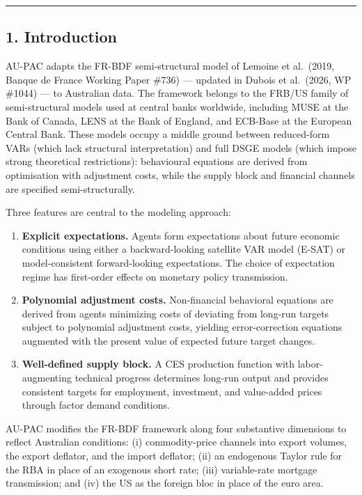 \documentclass[
]{article}
\begin{document}
\begin{center}\rule{0.5\linewidth}{0.5pt}\end{center}

\subsection{1. Introduction}\label{introduction}

AU-PAC adapts the FR-BDF semi-structural model of Lemoine et al.~(2019,
Banque de France Working Paper \#736) --- updated in Dubois et
al.~(2026, WP \#1044) --- to Australian data. The framework belongs to
the FRB/US family of semi-structural models used at central banks
worldwide, including MUSE at the Bank of Canada, LENS at the Bank of
England, and ECB-Base at the European Central Bank. These models occupy
a middle ground between reduced-form VARs (which lack structural
interpretation) and full DSGE models (which impose strong theoretical
restrictions): behavioural equations are derived from optimisation with
adjustment costs, while the supply block and financial channels are
specified semi-structurally.

Three features are central to the modeling approach:

\begin{enumerate}
\def\labelenumi{\arabic{enumi}.}
\item
  \textbf{Explicit expectations.} Agents form expectations about future
  economic conditions using either a backward-looking satellite VAR
  model (E-SAT) or model-consistent forward-looking expectations. The
  choice of expectation regime has first-order effects on monetary
  policy transmission.
\item
  \textbf{Polynomial adjustment costs.} Non-financial behavioral
  equations are derived from agents minimizing costs of deviating from
  long-run targets subject to polynomial adjustment costs, yielding
  error-correction equations augmented with the present value of
  expected future target changes.
\item
  \textbf{Well-defined supply block.} A CES production function with
  labor-augmenting technical progress determines long-run output and
  provides consistent targets for employment, investment, and
  value-added prices through factor demand conditions.
\end{enumerate}

AU-PAC modifies the FR-BDF framework along four substantive dimensions
to reflect Australian conditions: (i) commodity-price channels into
export volumes, the export deflator, and the import deflator; (ii) an
endogenous Taylor rule for the RBA in place of an exogenous short rate;
(iii) variable-rate mortgage transmission; and (iv) the US as the
foreign bloc in place of the euro area.
\end{document}
